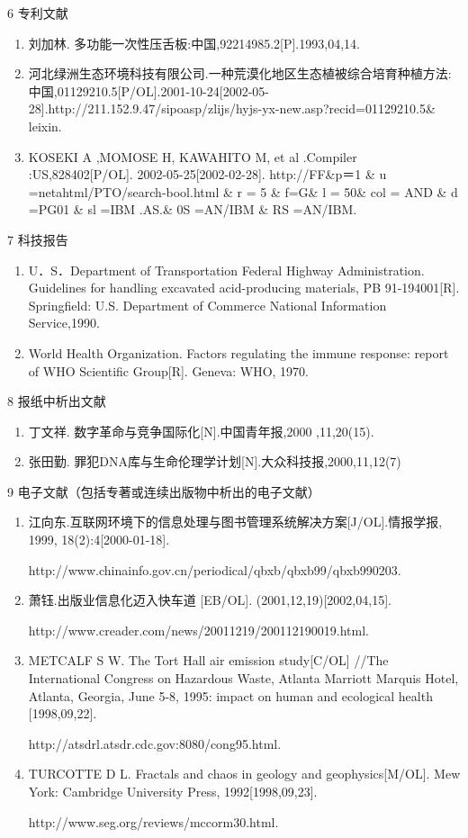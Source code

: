 6 专利文献
\begin{enumerate}
\item 刘加林. 多功能一次性压舌板:中国,92214985.2[P].1993,04,14. 
\item 河北绿洲生态环境科技有限公司.一种荒漠化地区生态植被综合培育种植方法:中国,01129210.5[P/OL].2001-10-24[2002-05-28].http://211.152.9.47/sipoasp/zlijs/hyjs-yx-new.asp?recid=01129210.5\& leixin. 
\item KOSEKI A ,MOMOSE H, KAWAHITO M, et al .Compiler :US,828402[P/OL]. 2002-05-25[2002-02-28]. http://FF\&p＝1 \& u =netahtml/PTO/search-bool.html \& r = 5 \& f=G\& l = 50\& col = AND \& d =PG01 \& sl =IBM .AS.\& 0S =AN/IBM \& RS =AN/IBM.
\end{enumerate}
\vspace{17.06pt}

7 科技报告
\begin{enumerate}
\item U．S．Department of Transportation Federal Highway Administration. Guidelines for handling excavated acid-producing materials, PB 91-194001[R]. Springfield: U.S. Department of Commerce National Information Service,1990.  
\item World Health Organization. Factors regulating the immune response: report of WHO Scientific Group[R]. Geneva: WHO, 1970.
\end{enumerate}
\vspace{17.06pt}

8 报纸中析出文献
\begin{enumerate}
\item 丁文祥. 数字革命与竞争国际化[N].中国青年报,2000 ,11,20(15). 
\item 张田勤. 罪犯DNA库与生命伦理学计划[N].大众科技报,2000,11,12(7)
\end{enumerate}
\vspace{17.06pt}

9 电子文献（包括专著或连续出版物中析出的电子文献）
\begin{enumerate}
\item 江向东.互联网环境下的信息处理与图书管理系统解决方案[J/OL].情报学报, 1999, 18(2):4[2000-01-18]. 

http://www.chinainfo.gov.cn/periodical/qbxb/qbxb99/qbxb990203. 
\item 萧钰.出版业信息化迈入快车道 [EB/OL]. (2001,12,19)[2002,04,15]. 

http://www.creader.com/news/20011219/200112190019.html. 
\item METCALF S W. The Tort Hall air emission study[C/OL] //The International Congress on Hazardous Waste, Atlanta Marriott Marquis Hotel, Atlanta, Georgia, June 5-8, 1995: impact on human and        ecological health [1998,09,22]. 

http://atsdrl.atsdr.cdc.gov:8080/cong95.html. 
\item TURCOTTE D L. Fractals and chaos in geology and geophysics[M/OL]. Mew York: Cambridge University Press, 1992[1998,09,23]. 

http://www.seg.org/reviews/mccorm30.html. 
\end{enumerate}

\setmainfont[Mapping=tex-text]{Times New Roman}